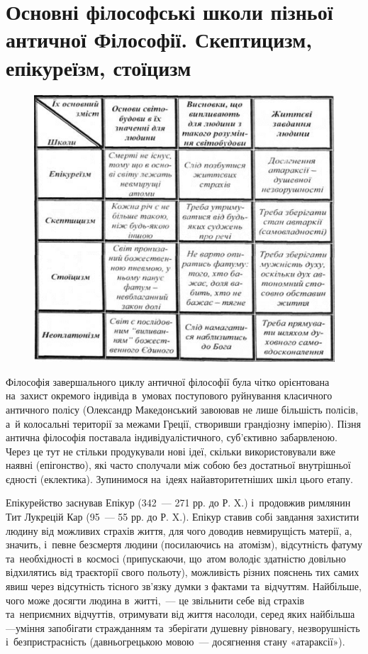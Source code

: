 \documentclass[a5paper,oneside,DIV=12,12pt,headings=small]{scrartcl}
\begin{document}
	\section{Основні філософські школи пізньої античної Філософії. Скептицизм, епікуреїзм, стоїцизм}	
		\begin{figure}[!htbp]
		\centering
			\includegraphics[width = \linewidth]{./assets/08.png}
		\end{figure}
		Філософія завершального циклу античної філософії була чітко орієнтована на~захист окремого індивіда в~умовах поступового руйнування класичного античного полісу (Олександр Македонський завоював не лише більшість полісів, а~й колосальні території за межами Греції, створивши грандіозну імперію). Пізня антична філософія поставала індивідуалістичного, суб'єктивно забарвленою. Через це тут не стільки продукували нові ідеї, скільки використовували вже наявні (епігонство), які часто сполучали між собою без достатньої внутрішньої єдності (еклектика). Зупинимося на~ідеях найавторитетніших шкіл цього етапу.
		
		Епікурейство заснував Епікур (342~— 271 рр. до Р. X.) і~продовжив римлянин Тит Лукрецій Кар (95~— 55 рр. до Р. X.). Епікур ставив собі завдання захистити людину від можливих страхів життя, для чого доводив невмирущість матерії, а, значить, і~певне безсмертя людини (посилаючись на~атомізм), відсутність фатуму та~необхідності в~космосі (припускаючи, що~атом володіє здатністю довільно відхилятись від траєкторії свого польоту), можливість різних пояснень тих самих явиш через відсутність тісного зв'язку думки з фактами та~відчуттям. Найбільше, чого може досягти людина в~житті,~— це звільнити себе від страхів та~неприємних відчуттів, отримувати від життя насолоди, серед яких найбільша—уміння запобігати стражданням та~зберігати душевну рівновагу, незворушність і~безпристрасність (давньогрецькою мовою~— досягнення стану «атараксії»).
		
\end{document}
